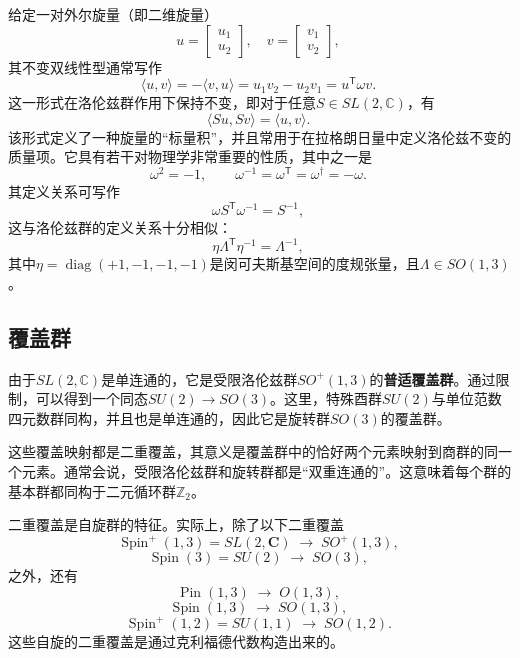 给定一对外尔旋量（即二维旋量）
\[
u = 
\begin{bmatrix}
u_{1} \\
u_{2}
\end{bmatrix},
\quad
v = 
\begin{bmatrix}
v_{1} \\
v_{2}
\end{bmatrix},~
\]
其不变双线性型通常写作
\[
\langle u, v \rangle = -\langle v, u \rangle
= u_{1}v_{2} - u_{2}v_{1}
= u^{\textsf{T}} \omega v.~
\]
这一形式在洛伦兹群作用下保持不变，即对于任意$S \in SL(2,\mathbb{C})$，有
\[
\langle Su, Sv \rangle = \langle u, v \rangle.~
\]
该形式定义了一种旋量的“标量积”，并且常用于在拉格朗日量中定义洛伦兹不变的质量项。它具有若干对物理学非常重要的性质，其中之一是
\[
\omega^{2} = -1,
\qquad
\omega^{-1} = \omega^{\textsf{T}} = \omega^{\dagger} = -\omega.~
\]
其定义关系可写作
\[
\omega S^{\textsf{T}} \omega^{-1} = S^{-1},~
\]
这与洛伦兹群的定义关系十分相似：
\[
\eta \Lambda^{\textsf{T}} \eta^{-1} = \Lambda^{-1},~
\]
其中$\eta = \operatorname{diag}(+1, -1, -1, -1)$是闵可夫斯基空间的度规张量，且$\Lambda \in SO(1,3)$。
\subsection{覆盖群}
由于$SL(2,\mathbb{C})$是单连通的，它是受限洛伦兹群$SO^{+}(1,3)$的\textbf{普适覆盖群}。通过限制，可以得到一个同态$SU(2) \to SO(3)$。这里，特殊酉群$SU(2)$与单位范数四元数群同构，并且也是单连通的，因此它是旋转群$SO(3)$的覆盖群。

这些覆盖映射都是二重覆盖，其意义是覆盖群中的恰好两个元素映射到商群的同一个元素。通常会说，受限洛伦兹群和旋转群都是“双重连通的”。这意味着每个群的基本群都同构于二元循环群$\mathbb{Z}_{2}$。

二重覆盖是自旋群的特征。实际上，除了以下二重覆盖
\[
\operatorname{Spin}^{+}(1,3) = SL(2,\mathbf{C}) \;\longrightarrow\; SO^{+}(1,3),~
\]
\[
\operatorname{Spin}(3) = SU(2) \;\longrightarrow\; SO(3),~
\]
之外，还有
\[
\operatorname{Pin}(1,3) \;\longrightarrow\; O(1,3),~
\]
\[
\operatorname{Spin}(1,3) \;\longrightarrow\; SO(1,3),~
\]
\[
\operatorname{Spin}^{+}(1,2) = SU(1,1) \;\longrightarrow\; SO(1,2).~
\]
这些自旋的二重覆盖是通过克利福德代数构造出来的。
